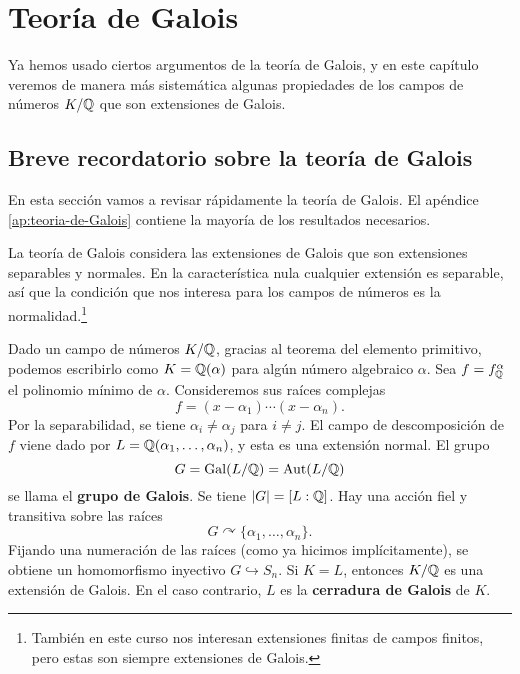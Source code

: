 \chapter{Teoría de Galois}
\label{cap:teoria-de-galois}

Ya hemos usado ciertos argumentos de la teoría de Galois, y en este capítulo
veremos de manera más sistemática algunas propiedades de los campos de números
$K/\mathbb{Q}$ que son extensiones de Galois.


\section{Breve recordatorio sobre la teoría de Galois}

En esta sección vamos a revisar rápidamente la teoría de Galois. El apéndice
\ref{ap:teoria-de-Galois} contiene la mayoría de los resultados necesarios.

\vspace{1em}

La teoría de Galois considera las extensiones de Galois que son extensiones
separables y normales. En la característica nula cualquier extensión es
separable, así que la condición que nos interesa para los campos de números es
la normalidad.\footnote{También en este curso nos interesan extensiones finitas
  de campos finitos, pero estas son siempre extensiones de Galois.}

Dado un campo de números $K/\mathbb{Q}$, gracias al teorema del elemento primitivo,
podemos escribirlo como $K = \mathbb{Q} (\alpha)$ para algún número algebraico
$\alpha$. Sea $f = f^\alpha_{\mathbb{Q}}$ el polinomio mínimo de $\alpha$. Consideremos
sus raíces complejas
$$f = (x - \alpha_1) \cdots (x - \alpha_n).$$
Por la separabilidad, se tiene $\alpha_i \ne \alpha_j$ para $i \ne j$.
El campo de descomposición de $f$ viene dado por
$L = \mathbb{Q} (\alpha_1, \ldots, \alpha_n)$, y esta es una extensión normal.
El grupo
$$G = \operatorname{Gal} (L/\mathbb{Q}) = \operatorname{Aut} (L/\mathbb{Q})$$
se llama el \textbf{grupo de Galois}. Se tiene $|G| = [L : \mathbb{Q}]$.
Hay una acción fiel y transitiva sobre las raíces
$$G \curvearrowright \{ \alpha_1, \ldots, \alpha_n \}.$$
Fijando una numeración de las raíces (como ya hicimos implícitamente),
se obtiene un homomorfismo inyectivo $G \hookrightarrow S_n$. Si $K = L$,
entonces $K/\mathbb{Q}$ es una extensión de Galois. En el caso contrario, $L$ es la
\textbf{cerradura de Galois} de $K$.

